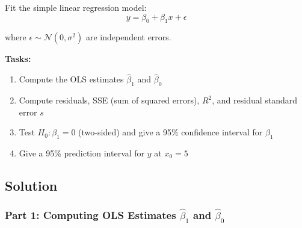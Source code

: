\documentclass[12pt]{article}
\begin{document}
Fit the simple linear regression model:
\[
y = \beta_0 + \beta_1 x + \epsilon
\]

where $\epsilon \sim \mathcal{N}(0, \sigma^2)$ are independent errors.

\textbf{Tasks:}
\begin{enumerate}
    \item Compute the OLS estimates $\hat{\beta}_1$ and $\hat{\beta}_0$
    \item Compute residuals, SSE (sum of squared errors), $R^2$, and residual standard error $s$
    \item Test $H_0: \beta_1 = 0$ (two-sided) and give a 95\% confidence interval for $\beta_1$
    \item Give a 95\% prediction interval for $y$ at $x_0 = 5$
\end{enumerate}

\subsection{Solution}

\subsubsection{Part 1: Computing OLS Estimates $\hat{\beta}_1$ and $\hat{\beta}_0$}
\end{document}
